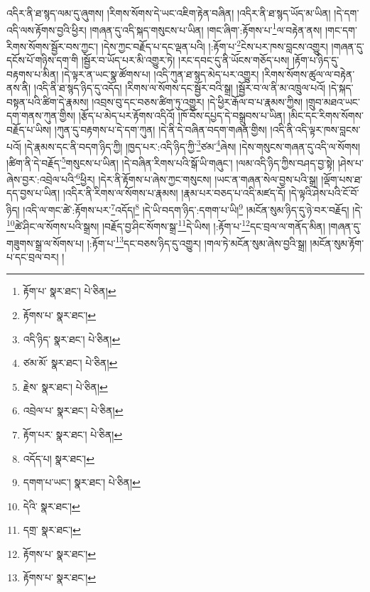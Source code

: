 འདིར་ནི་ཐ་སྙད་ལམ་དུ་ཞུགས། །རིགས་སོགས་དེ་ཡང་འཇིག་རྟེན་བཞིན། །འདིར་ནི་ཐ་སྙད་ཡོད་མ་ཡིན། །དེ་དག་འདི་ལས་རྟོགས་བྱའི་ཕྱིར། །གཞན་དུ་འདི་སྐད་གསུངས་པ་ཡིན། །གང་ཞིག་:རྟོགས་པ་\footnote{རྟོག་པ་  སྣར་ཐང་།  པེ་ཅིན། }ལ་བརྟེན་ནས། །གང་དག་རིགས་སོགས་སྦྱོར་བས་ཀྱང་། །དེས་ཀྱང་བརྗོད་པ་དང་ལྡན་པའི། །:རྟོག་པ་\footnote{རྟོགས་པ་  སྣར་ཐང་། }ངེས་པར་ཁས་བླངས་འགྱུར། །གཞན་དུ་དངོས་པོ་གཉིས་དག་གི །སྦྱོར་བ་ཡོད་པར་མི་འགྱུར་ཏེ། །རང་དབང་དུ་ནི་ཡོངས་གཅོད་པས། །རྟོག་པ་ཉིད་དུ་བརྟགས་པ་མིན། །དེ་ལྟར་ན་ཡང་སྣ་ཚོགས་པ། །འདི་ཀུན་ཐ་སྙད་མེད་པར་འགྱུར། །རིགས་སོགས་ཚུལ་ལ་བརྟེན་ནས་ནི། །འདི་ནི་ཐ་སྙད་ཉིད་དུ་འདོད། །རིགས་ལ་སོགས་དང་སྦྱོར་བའི་སྒྲ། །སྦྱོར་བ་ལ་ནི་མ་འཁྲུལ་པའོ། །དེ་སྐད་བསྟན་པའི་ཚིག་དེ་རྣམས། །འབྲས་བུ་དང་བཅས་ཚིག་ཏུ་འགྱུར། །དེ་ཕྱིར་རྒོལ་བ་པ་རྣམས་ཀྱིས། །གྲུབ་མཐའ་ཡང་དག་གནས་ཀུན་གྱིས། །རྩོད་པ་མེད་པར་རྟོགས་འདིའོ། །ཁོ་བོས་དཔྱད་དེ་བསྒྲུབས་པ་ཡིན། །མིང་དང་རིགས་སོགས་བརྗོད་པ་ཡིས། །ཀུན་དུ་བརྟགས་པ་དེ་དག་ཀུན། །དེ་ནི་དེ་བཞིན་བདག་གཞན་གྱིས། །འདི་ནི་འདི་ལྟར་ཁས་བླངས་པའོ། །དེ་རྣམས་དང་ནི་བདག་ཉིད་ཀྱི། །ཁྱད་པར་:འདི་ཉིད་ཀྱི་\footnote{འདི་ཉིད་  སྣར་ཐང་།  པེ་ཅིན། }ཙམ་\footnote{ཙམ་མོ་  སྣར་ཐང་།  པེ་ཅིན། }ཞེས། །དེས་གསུངས་གཞན་དུ་འདི་ལ་སོགས། །ཚིག་ནི་དེ་བརྗོད་\footnote{རྗེས་  སྣར་ཐང་།  པེ་ཅིན། }གསུངས་པ་ཡིན། །དེ་བཞིན་རིགས་པའི་སྒོ་ཡི་གཞུང་། །ལམ་འདི་ཉིད་ཀྱིས་བཤད་བྱ་སྟེ། །ཤེས་པ་ཞེས་བྱར་:འབྲེལ་པའི་\footnote{འབྲེལ་པ་  སྣར་ཐང་།  པེ་ཅིན། }ཕྱིར། །དེར་ནི་རྟོགས་པ་ཞེས་ཀྱང་གསུངས། །ཡང་ན་གཞན་སེལ་བྱས་པའི་སྒྲ། །ལྡོག་པས་ཐ་དད་བྱས་པ་ཡིན། །འདིར་ནི་རིགས་ལ་སོགས་པ་རྣམས། །རྣམ་པར་བཅད་པ་འདི་མཛད་དོ། །དེ་ལྟའི་ཤེས་པའི་ངོ་བོ་ཉིད། །འདི་ལ་གང་ཚེ་:རྟོགས་པར་\footnote{རྟོག་པར་  སྣར་ཐང་།  པེ་ཅིན། }འདོད།\footnote{འདོད་པ།  སྣར་ཐང་། } །དེ་ཡི་བདག་ཉིད་:དགག་པ་ཡི།\footnote{དགག་པ་ཡང་།  སྣར་ཐང་།  པེ་ཅིན། } །མངོན་སུམ་ཉིད་དུ་ཉེ་བར་བརྗོད། །དེ་\footnote{དེའི་  སྣར་ཐང་། }ཚེ་ཤིང་ལ་སོགས་པའི་སྒྲས། །བརྗོད་བྱ་ཤིང་སོགས་སྒྲ་\footnote{དགྲ་  སྣར་ཐང་། }དེ་ཡིས། །:རྟོག་པ་\footnote{རྟོགས་པ་  སྣར་ཐང་། }དང་བྲལ་ལ་གནོད་མིན། །གཞན་དུ་གཟུགས་སྒྲ་ལ་སོགས་པ། །:རྟོག་པ་\footnote{རྟོགས་པ་  སྣར་ཐང་། }དང་བཅས་ཉིད་དུ་འགྱུར། །གལ་ཏེ་མངོན་སུམ་ཞེས་བྱའི་སྒྲ། །མངོན་སུམ་རྟོག་པ་དང་བྲལ་བར། །
